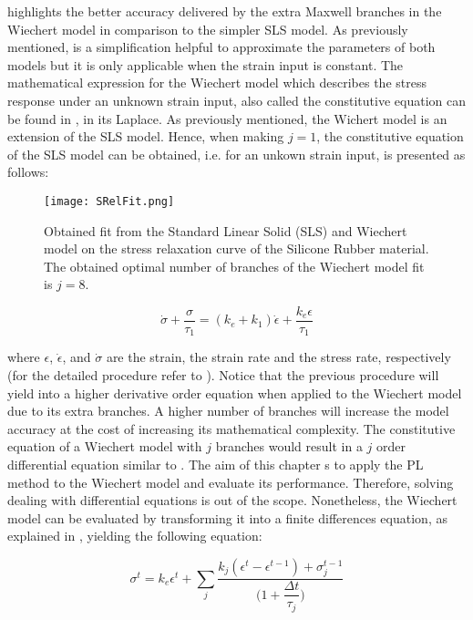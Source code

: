  highlights the better accuracy delivered by the extra Maxwell branches in the Wiechert model in comparison to the simpler SLS model. As previously mentioned,  is a simplification helpful to approximate the parameters of both models but it is only applicable when the strain input is constant. The mathematical expression for the Wiechert model which describes the stress response under an unknown strain input, also called the constitutive equation can be found in \cite{roylance2001engineering}, in its Laplace. 
As previously mentioned, the Wichert model is an extension of the SLS model. Hence, when making $j=1$, the constitutive equation of the SLS model can be obtained, i.e. for an unkown strain input, is presented as follows:

\begin{figure}[htb!]
	\centering
    \texttt{[image: SRelFit.png]}
    \caption{Obtained fit from the Standard Linear Solid (SLS) and Wiechert model on the stress relaxation curve of the Silicone Rubber material. The obtained optimal number of branches of the Wiechert model fit is $j=8$.}
    \label{fig:StressRelFit}
\end{figure}

\begin{equation}
\label{eq3}
\dot{\sigma} + \frac{\sigma}{\tau_1} =  (k_e + k_1)\dot{\epsilon} + \frac{k_e\epsilon}{\tau_1}
\end{equation}

\noindent where $\epsilon$, $\dot{\epsilon}$, and $\dot{\sigma}$ are the strain, the strain rate and the stress rate, respectively (for the detailed procedure refer to \cite{roylance2001engineering}). Notice that the previous procedure will yield into a higher derivative order equation when applied to the Wiechert model due to its extra branches. A higher number of branches will increase the model accuracy at the cost of increasing its mathematical complexity. The constitutive equation of a Wiechert model with $j$ branches would result in a $j$ order differential equation similar to . The aim of this chapter s to apply the PL method to the Wiechert model and evaluate its performance. Therefore, solving dealing with differential equations is out of the scope. Nonetheless, the Wiechert model can be evaluated by transforming it into a finite differences equation, as explained in \cite{roylance2001engineering}, yielding the following equation:

\begin{equation}
    \label{eq4}
    \sigma^t = k_e\epsilon^t + \sum_j \frac{k_j(\epsilon^t - \epsilon^{t-1}) + \sigma_j^{t-1}}{\bigg(1+\dfrac{\Delta t}{\tau_j}\bigg)}
\end{equation}

